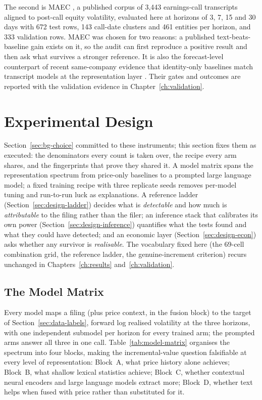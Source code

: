 The second is MAEC \cite{maec2020}, a published corpus of 3{,}443 earnings-call transcripts aligned to post-call equity volatility, evaluated here at horizons of 3, 7, 15 and 30 days with 672 test rows, 143 call-date clusters and 461 entities per horizon, and 333 validation rows. %
MAEC was chosen for two reasons: a published text-beats-baseline gain exists on it, so the audit can first reproduce a positive result and then ask what survives a stronger reference. It is also the forecast-level counterpart of recent same-company evidence that identity-only baselines match transcript models at the representation layer \cite{yu2025samecompany}. Their gates and outcomes are reported with the validation evidence in Chapter~\ref{ch:validation}.

\section{Experimental Design}
\label{sec:design}

Section~\ref{sec:bg-choice} committed to these instruments; this section fixes them as executed: the denominators every count is taken over, the recipe every arm shares, and the fingerprints that prove they shared it. A model matrix spans the representation spectrum from price-only baselines to a prompted large language model; a fixed training recipe with three replicate seeds removes per-model tuning and run-to-run luck as explanations. A reference ladder (Section~\ref{sec:design-ladder}) decides what is \emph{detectable} and how much is \emph{attributable} to the filing rather than the filer; an inference stack that calibrates its own power (Section~\ref{sec:design-inference}) quantifies what the tests found and what they could have detected; and an economic layer (Section~\ref{sec:design-econ}) asks whether any survivor is \emph{realisable}. The vocabulary fixed here (the 69-cell combination grid, the reference ladder, the genuine-increment criterion) recurs unchanged in Chapters~\ref{ch:results} and~\ref{ch:validation}.

\subsection{The Model Matrix}
\label{sec:design-models}

Every model maps a filing (plus price context, in the fusion block) to the target of Section~\ref{sec:data-labels}, forward log realised volatility at the three horizons, with one independent submodel per horizon for every trained arm; the prompted arms answer all three in one call. %
Table~\ref{tab:model-matrix} organises the spectrum into four blocks, making the incremental-value question falsifiable at every level of representation: Block~A, what price history alone achieves; Block~B, what shallow lexical statistics achieve; Block~C, whether contextual neural encoders and large language models extract more; Block~D, whether text helps when fused with price rather than substituted for it. %

